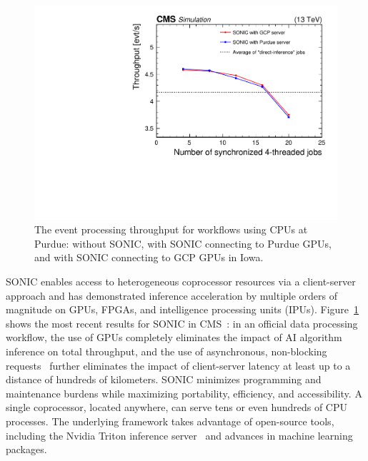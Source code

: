 \begin{figure}[htb!]
\centering
\includegraphics[width=0.5\myfigurewidth]{figures/MLG-23-001_Figure_009.pdf}
\caption{The event processing throughput for workflows using CPUs at Purdue: without SONIC, with SONIC connecting to Purdue GPUs, and with SONIC connecting to GCP GPUs in Iowa.}
\label{fig:sonic}
\end{figure}

SONIC enables access to heterogeneous coprocessor resources via a client-server approach
and has demonstrated inference acceleration by multiple orders of magnitude on GPUs, FPGAs, and intelligence processing units (IPUs).
Figure~\ref{fig:sonic} shows the most recent results for SONIC in CMS~\cite{}:
in an official data processing workflow, the use of GPUs completely eliminates the impact of AI algorithm inference on total throughput,
and the use of asynchronous, non-blocking requests~\cite{Bocci:2020olh} further eliminates the impact of client-server latency at least up to a distance of hundreds of kilometers.
SONIC minimizes programming and maintenance burdens while maximizing portability, efficiency, and accessibility.
A single coprocessor, located anywhere, can serve tens or even hundreds of CPU processes.
The underlying framework takes advantage of open-source tools, including the Nvidia Triton inference server~\cite{nvidia} and advances in machine learning packages.

